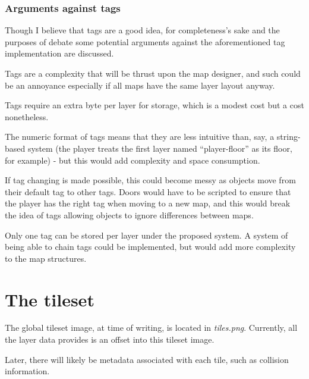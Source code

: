 \documentclass [12pt,a4paper]{article}
\begin{document}
\subsubsection{Arguments against tags}

Though I believe that tags are a good idea, for completeness's sake
and the purposes of debate some potential arguments against the
aforementioned tag implementation are discussed.

Tags are a complexity that will be thrust upon the map designer, and
such could be an annoyance especially if all maps have the same layer
layout anyway.

Tags require an extra byte per layer for storage, which is a modest
cost but a cost nonetheless.

The numeric format of tags means that they are less intuitive than,
say, a string-based system (the player treats the first layer named
``player-floor'' as its floor, for example) - but this would add
complexity and space consumption.

If tag changing is made possible, this could become messy as objects
move from their default tag to other tags.  Doors would have to be
scripted to ensure that the player has the right tag when moving to a
new map, and this would break the idea of tags allowing objects to
ignore differences between maps.

Only one tag can be stored per layer under the proposed system.  A
system of being able to chain tags could be implemented, but would add
more complexity to the map structures.

\section {The tileset}

The global tileset image, at time of writing, is located in
\emph{tiles.png}.  Currently, all the layer data provides is an offset
into this tileset image.

Later, there will likely be metadata associated with each tile, such
as collision information.
\end{document}
